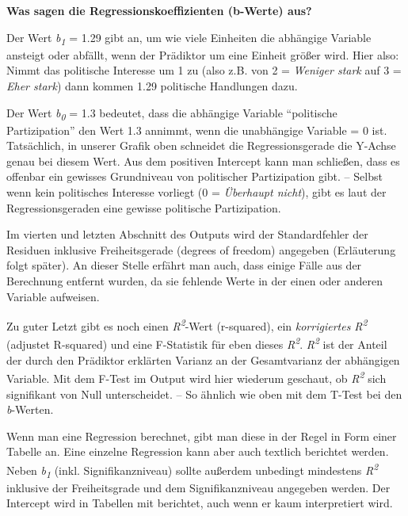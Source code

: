 \documentclass[
]{book}
\begin{document}
\leavevmode\hypertarget{info_b}{}%
\textbf{Was sagen die Regressionskoeffizienten (b-Werte) aus?}

Der Wert \emph{b\textsubscript{1}} = 1.29 gibt an, um wie viele Einheiten die abhängige Variable ansteigt oder abfällt, wenn der Prädiktor um eine Einheit größer wird. Hier also: Nimmt das politische Interesse um 1 zu (also z.B. von 2 = \emph{Weniger stark} auf 3 = \emph{Eher stark}) dann kommen 1.29 politische Handlungen dazu.

Der Wert \emph{b\textsubscript{0}} = 1.3 bedeutet, dass die abhängige Variable ``politische Partizipation'' den Wert 1.3 annimmt, wenn die unabhängige Variable = 0 ist. Tatsächlich, in unserer Grafik oben schneidet die Regressionsgerade die Y-Achse genau bei diesem Wert. Aus dem positiven Intercept kann man schließen, dass es offenbar ein gewisses Grundniveau von politischer Partizipation gibt. -- Selbst wenn kein politisches Interesse vorliegt (0 = \emph{Überhaupt nicht}), gibt es laut der Regressionsgeraden eine gewisse politische Partizipation.

Im vierten und letzten Abschnitt des Outputs wird der Standardfehler der Residuen inklusive Freiheitsgerade (degrees of freedom) angegeben (Erläuterung folgt später). An dieser Stelle erfährt man auch, dass einige Fälle aus der Berechnung entfernt wurden, da sie fehlende Werte in der einen oder anderen Variable aufweisen.

Zu guter Letzt gibt es noch einen \emph{R\textsuperscript{2}}-Wert (r-squared), ein \emph{korrigiertes R\textsuperscript{2}} (adjustet R-squared) und eine F-Statistik für eben dieses \emph{R\textsuperscript{2}}. \emph{R\textsuperscript{2}} ist der Anteil der durch den Prädiktor erklärten Varianz an der Gesamtvarianz der abhängigen Variable. Mit dem F-Test im Output wird hier wiederum geschaut, ob \emph{R\textsuperscript{2}} sich signifikant von Null unterscheidet. -- So ähnlich wie oben mit dem T-Test bei den \emph{b}-Werten.

Wenn man eine Regression berechnet, gibt man diese in der Regel in Form einer Tabelle an. Eine einzelne Regression kann aber auch textlich berichtet werden. Neben \emph{b\textsubscript{1}} (inkl. Signifikanzniveau) sollte außerdem unbedingt mindestens \emph{R\textsuperscript{2}} inklusive der Freiheitsgrade und dem Signifikanzniveau angegeben werden. Der Intercept wird in Tabellen mit berichtet, auch wenn er kaum interpretiert wird.
\end{document}
